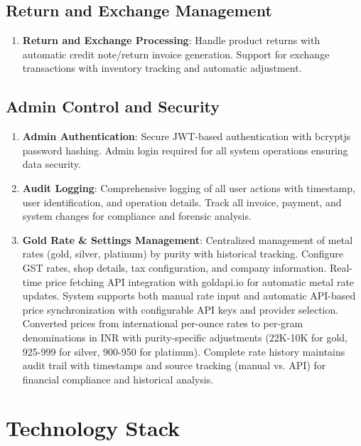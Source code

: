 \documentclass[12pt,a4paper]{report}
\begin{document}
\subsection{Return and Exchange Management}
\begin{enumerate}[label=\roman*)]
    \item \textbf{Return and Exchange Processing}: Handle product returns with automatic credit note/return invoice generation. Support for exchange transactions with inventory tracking and automatic adjustment.
\end{enumerate}

\subsection{Admin Control and Security}
\begin{enumerate}[label=\roman*)]
    \item \textbf{Admin Authentication}: Secure JWT-based authentication with bcryptjs password hashing. Admin login required for all system operations ensuring data security.
    \item \textbf{Audit Logging}: Comprehensive logging of all user actions with timestamp, user identification, and operation details. Track all invoice, payment, and system changes for compliance and forensic analysis.
    \item \textbf{Gold Rate \& Settings Management}: Centralized management of metal rates (gold, silver, platinum) by purity with historical tracking. Configure GST rates, shop details, tax configuration, and company information. Real-time price fetching API integration with goldapi.io for automatic metal rate updates. System supports both manual rate input and automatic API-based price synchronization with configurable API keys and provider selection. Converted prices from international per-ounce rates to per-gram denominations in INR with purity-specific adjustments (22K-10K for gold, 925-999 for silver, 900-950 for platinum). Complete rate history maintains audit trail with timestamps and source tracking (manual vs. API) for financial compliance and historical analysis.
\end{enumerate}

\section{Technology Stack}
\end{document}
